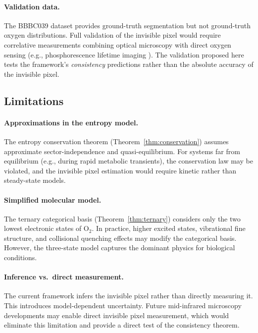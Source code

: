 \documentclass[11pt,twocolumn,a4paper]{article}
\begin{document}
\paragraph{Validation data.}
The BBBC039 dataset provides ground-truth segmentation but not ground-truth oxygen distributions.
Full validation of the invisible pixel would require correlative measurements combining optical microscopy with direct oxygen sensing (e.g., phosphorescence lifetime imaging \citep{Papkovsky2012}).
The validation proposed here tests the framework's \emph{consistency} predictions rather than the absolute accuracy of the invisible pixel.

\subsection{Limitations}

\paragraph{Approximations in the entropy model.}
The entropy conservation theorem (Theorem~\ref{thm:conservation}) assumes approximate sector-independence and quasi-equilibrium.
For systems far from equilibrium (e.g., during rapid metabolic transients), the conservation law may be violated, and the invisible pixel estimation would require kinetic rather than steady-state models.

\paragraph{Simplified molecular model.}
The ternary categorical basis (Theorem~\ref{thm:ternary}) considers only the two lowest electronic states of O$_2$.
In practice, higher excited states, vibrational fine structure, and collisional quenching effects may modify the categorical basis.
However, the three-state model captures the dominant physics for biological conditions.

\paragraph{Inference vs.\ direct measurement.}
The current framework infers the invisible pixel rather than directly measuring it.
This introduces model-dependent uncertainty.
Future mid-infrared microscopy developments may enable direct invisible pixel measurement, which would eliminate this limitation and provide a direct test of the consistency theorem.
\end{document}
